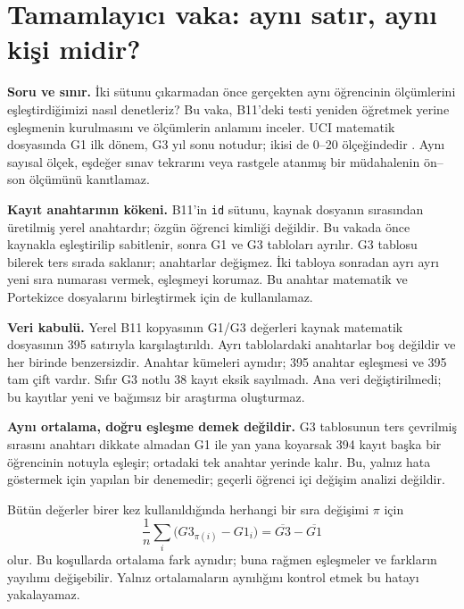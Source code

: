 \section{Tamamlayıcı vaka: aynı satır, aynı kişi midir?}
\label{sec:v3-eslesme}

\textbf{Soru ve sınır.} İki sütunu çıkarmadan önce gerçekten aynı
öğrencinin ölçümlerini eşleştirdiğimizi nasıl denetleriz? Bu vaka,
B11'deki testi yeniden öğretmek yerine eşleşmenin kurulmasını ve
ölçümlerin anlamını inceler. UCI matematik dosyasında G1 ilk dönem,
G3 yıl sonu notudur; ikisi de 0--20 ölçeğindedir
\citep{cortez2008data}. Aynı sayısal ölçek, eşdeğer sınav tekrarını
veya rastgele atanmış bir müdahalenin ön--son ölçümünü kanıtlamaz.

\textbf{Kayıt anahtarının kökeni.} B11'in \texttt{id} sütunu, kaynak
dosyanın sırasından üretilmiş yerel anahtardır; özgün öğrenci kimliği
değildir. Bu vakada önce kaynakla eşleştirilip sabitlenir, sonra G1 ve
G3 tabloları ayrılır. G3 tablosu bilerek ters sırada saklanır; anahtarlar
değişmez. İki tabloya sonradan ayrı ayrı yeni sıra numarası vermek,
eşleşmeyi korumaz. Bu anahtar matematik ve Portekizce dosyalarını
birleştirmek için de kullanılamaz.

\textbf{Veri kabulü.} Yerel B11 kopyasının G1/G3 değerleri kaynak
matematik dosyasının 395 satırıyla karşılaştırıldı. Ayrı tablolardaki
anahtarlar boş değildir ve her birinde benzersizdir. Anahtar kümeleri
aynıdır; 395 anahtar eşleşmesi ve 395 tam çift vardır. Sıfır G3 notlu
38 kayıt eksik sayılmadı. Ana veri değiştirilmedi; bu kayıtlar yeni
ve bağımsız bir araştırma oluşturmaz.

\begin{mistakebox}
\textbf{Aynı ortalama, doğru eşleşme demek değildir.} G3 tablosunun
ters çevrilmiş sırasını anahtarı dikkate almadan G1 ile yan yana
koyarsak 394 kayıt başka bir öğrencinin notuyla eşleşir; ortadaki
tek anahtar yerinde kalır. Bu, yalnız hata göstermek için yapılan
bir denemedir; geçerli öğrenci içi değişim analizi değildir.

Bütün değerler birer kez kullanıldığında herhangi bir sıra değişimi
$\pi$ için
\[
\frac{1}{n}\sum_i\bigl(G3_{\pi(i)}-G1_i\bigr)
=\overline{G3}-\overline{G1}
\]
olur. Bu koşullarda ortalama fark aynıdır; buna rağmen eşleşmeler
ve farkların yayılımı değişebilir. Yalnız ortalamaların
aynılığını kontrol etmek bu hatayı yakalayamaz.
\end{mistakebox}

